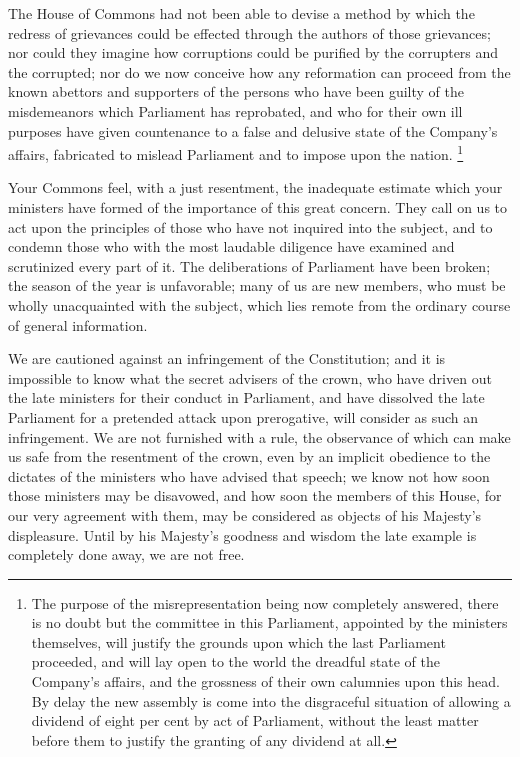 The House of Commons had not been able to devise a method by which the redress of grievances could be effected through the authors of those grievances; nor could they imagine how corruptions could be purified by the corrupters and the corrupted; nor do we now conceive how any reformation can proceed from the known abettors and supporters of the persons who have been guilty of the misdemeanors which Parliament has reprobated, and who for their own ill purposes have given countenance to a false and delusive state of the Company's affairs, fabricated to mislead Parliament and to impose upon the nation.
\footnote{ The purpose of the misrepresentation being now completely answered, there is no doubt but the committee in this Parliament, appointed by the ministers themselves, will justify the grounds upon which the last Parliament proceeded, and will lay open to the world the dreadful state of the Company's affairs, and the grossness of their own calumnies upon this head. By delay the new assembly is come into the disgraceful situation of allowing a dividend of eight per cent by act of Parliament, without the least matter before them to justify the granting of any dividend at all.}

Your Commons feel, with a just resentment, the inadequate estimate which your ministers have formed of the importance of this great concern. They call on us to act upon the principles of those who have not inquired into the subject, and to condemn those who with the most laudable diligence have examined and scrutinized every part of it. The deliberations of Parliament have been broken; the season of the year is unfavorable; many of us are new members, who must be wholly unacquainted with the subject, which lies remote from the ordinary course of general information.

We are cautioned against an infringement of the Constitution; and it is impossible to know what the secret advisers of the crown, who have driven out the late ministers for their conduct in Parliament, and have dissolved the late Parliament for a pretended attack upon prerogative, will consider as such an infringement. We are not furnished with a rule, the observance of which can make us safe from the resentment of the crown, even by an implicit obedience to the dictates of the ministers who have advised that speech; we know not how soon those ministers may be disavowed, and how soon the members of this House, for our very agreement with them, may be considered as objects of his Majesty's displeasure. Until by his Majesty's goodness and wisdom the late example is completely done away, we are not free.


